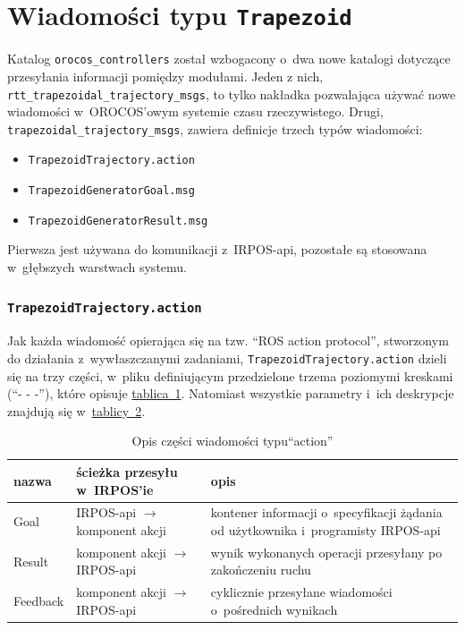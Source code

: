 \documentclass[a4paper, 12pt]{article}
\begin{document}
	\section{Wiadomości typu \texttt{Trapezoid}}
	\label{sec:msgs}
	Katalog \texttt{orocos\_controllers} został wzbogacony o~dwa nowe katalogi dotyczące przesyłania informacji pomiędzy modułami. Jeden z nich, \texttt{rtt\_trapezoidal\_trajectory\_msgs}, to tylko nakładka pozwalająca używać nowe wiadomości w~OROCOS'owym systemie czasu rzeczywistego. Drugi, \texttt{trapezoidal\_trajectory\_msgs}, zawiera definicje trzech typów wiadomości: 
	\begin{itemize}
	\item \texttt{TrapezoidTrajectory.action}
	\item \texttt{TrapezoidGeneratorGoal.msg}
	\item \texttt{TrapezoidGeneratorResult.msg}
	\end{itemize}
	Pierwsza jest używana do komunikacji z~IRPOS-api, pozostałe są stosowana w~głębszych warstwach systemu. 
	\subsubsection{\texttt{TrapezoidTrajectory.action}}
	\label{sec:msgsact}
	Jak każda wiadomość opierająca się na tzw. \textquotedblleft ROS action protocol\textquotedblright, stworzonym do działania z~wywłaszczanymi zadaniami\cite{ROS}, \texttt{TrapezoidTrajectory.action} dzieli się na trzy części, w~pliku definiującym przedzielone trzema poziomymi kreskami (\textquotedblleft - - -\textquotedblright), które opisuje \hyperref[tab:action]{tablica~1}. Natomiast wszystkie parametry i~ich deskrypcje znajdują się w~\hyperref[tab:actionparams]{tablicy~2}.
	

	\begin{table}[H]
	\label{tab:action}
	\centering
	\begin{tabular}{|m{4em}|m{15em}|m{18em}|}
	 \hline
	 nazwa & ścieżka przesyłu w~IRPOS'ie & opis\\
	 \hline
	 \hline
	 Goal & IRPOS-api $\rightarrow$ komponent akcji & kontener informacji o~specyfikacji żądania od użytkownika i~programisty IRPOS-api \\  
	 \hline
	 Result & komponent akcji $\rightarrow$ IRPOS-api & wynik wykonanych operacji przesyłany  po zakończeniu ruchu \\
	 \hline
	 Feedback & komponent akcji $\rightarrow$ IRPOS-api  & cyklicznie przesyłane wiadomości o~pośrednich wynikach \\
	 \hline
	\end{tabular}
	\caption{Opis części wiadomości typu\textquotedblleft action\textquotedblright}
	\end{table}
	
\end{document}

